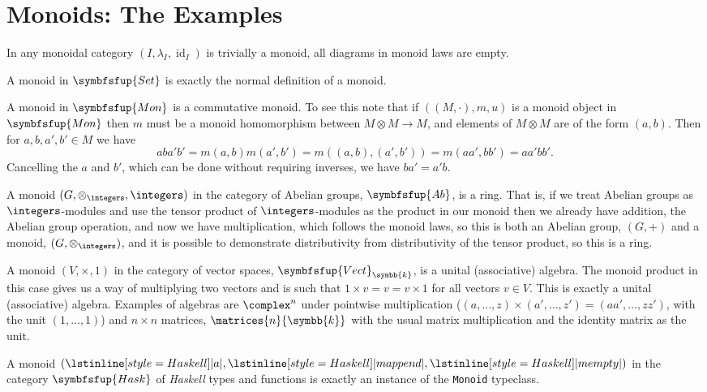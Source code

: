 \documentclass[fleqn]{NotesClass}
\makeatletter
\newcommand{\Haskell}{\textit{Haskell}}
\newcommand{\c@egory}[1]{\symbfsfup{#1}}
\newcommand{\Set}{\c@egory{Set}}
\renewcommand{\field}{\symbb{k}}
\newcommand{\Vect}[1][\field]{{\c@egory{Vect}_{#1}}}
\newcommand{\Mon}{\c@egory{Mon}}
\newcommand{\Ab}{\c@egory{Ab}}
\newcommand{\Hask}{\c@egory{Hask}}
\DeclareMathOperator{\id}{id}
\makeatother
\begin{document}
    \section{Monoids: The Examples}
    In any monoidal category \((I, \lambda_I, \id_I)\) is trivially a monoid, all diagrams in monoid laws are empty.
    
    A monoid in \(\Set\) is exactly the normal definition of a monoid.
    
    A monoid in \(\Mon\) is a commutative monoid.
    To see this note that if \(((M, \cdot), m, u)\) is a monoid object in \(\Mon\) then \(m\) must be a monoid homomorphism between \(M \otimes M \to M\), and elements of \(M \otimes M\) are of the form \((a, b)\).
    Then for \(a, b, a', b' \in M\) we have
    \begin{equation}
        aba'b' = m(a, b)m(a', b') = m((a,b), (a',b')) = m(aa',bb') = aa'bb'.
    \end{equation}
    Cancelling the \(a\) and \(b'\), which can be done without requiring inverses, we have \(ba' = a'b\).
    
    A monoid \((G, \otimes_{\integers}, \integers)\) in the category of Abelian groups, \(\Ab\), is a ring.
    That is, if we treat Abelian groups as \(\integers\)-modules and use the tensor product of \(\integers\)-modules as the product in our monoid then we already have addition, the Abelian group operation, and now we have multiplication, which follows the monoid laws, so this is both an Abelian group, \((G, +)\) and a monoid, \((G, \otimes_{\integers})\), and it is possible to demonstrate distributivity from distributivity of the tensor product, so this is a ring.
    
    A monoid \((V, \times, 1)\) in the category of vector spaces, \(\Vect\), is a unital (associative) algebra.
    The monoid product in this case gives us a way of multiplying two vectors and is such that \(1\times v = v = v\times 1\) for all vectors \(v \in V\).
    This is exactly a unital (associative) algebra.
    Examples of algebras are \(\complex^n\) under pointwise multiplication (\((a, \dotsc, z) \times (a', \dotsc, z') = (aa', \dotsc, zz')\), with the unit \((1, \dotsc, 1)\)) and \(n \times n\) matrices, \(\matrices{n}{\field}\) with the usual matrix multiplication and the identity matrix as the unit.
    
    A monoid \((\lstinline[style=Haskell]|a|, \lstinline[style=Haskell]|mappend|, \lstinline[style=Haskell]|mempty|)\) in the category \(\Hask\) of \Haskell{} types and functions is exactly an instance of the \lstinline[style=Haskell]|Monoid| typeclass.
    
\end{document}
